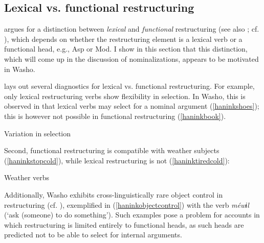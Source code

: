 \documentclass[output=paper]{langscibook}
\begin{document}
\subsection{Lexical vs. functional restructuring} \label{haninksec:vs}\largerpage[1.75]
\citet{wurmbrand2001} argues for a distinction between {\itshape lexical} and {\itshape functional} restructuring (see also \citealt{Wurmbrand2004}; cf. \citealt{cinque2001,cinque2004,grano2012diss}), which depends on  whether the restructuring element is a lexical verb or a functional head, e.g., Asp or Mod. I show in this section that this distinction, which will come up in the discussion of nominalizations, appears to be  motivated in Washo. 

\citet{Wurmbrand2004} lays out several diagnostics for lexical vs. functional restructuring. For example, only lexical restructuring verbs show flexibility in selection. In Washo, this is observed in that lexical verbs may select for a nominal argument (\ref{haninkshoes}); this is however not possible in functional restructuring (\ref{haninkbook}).

\ea Variation in selection
\z
\z

\begin{sloppypar}Second, functional restructuring is compatible with weather subjects (\ref{haninkstopcold}), while lexical restructuring is not (\ref{haninktiredcold}):\end{sloppypar}

\ea Weather verbs
\z
\z

Additionally, Washo exhibits cross-linguistically rare object control in restructuring (cf. \citealt{cinque2001}), exemplified in (\ref{haninkobjectcontrol}) with the verb {\itshape méwɨl} (`ask (someone) to do something'). Such examples pose a problem for accounts in which restructuring is limited entirely to functional heads, as such heads are predicted not to be able to select for internal arguments.
\end{document}
